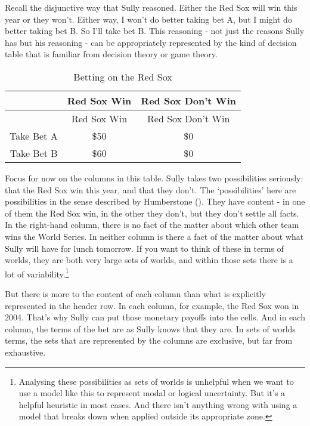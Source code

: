 \documentclass[
  12pt,
  letterpaper,
]{scrbook}
\begin{document}
Recall the disjunctive way that Sully reasoned. Either the Red Sox will
win this year or they won't. Either way, I won't do better taking bet A,
but I might do better taking bet B. So I'll take bet B. This reasoning -
not just the reasons Sully has but his reasoning - can be appropriately
represented by the kind of decision table that is familiar from decision
theory or game theory.

\begin{longtable}[]{@{}rcc@{}}
\caption{Betting on the Red Sox}\label{tbl-redsox}\tabularnewline
\toprule\noalign{}
~ & Red Sox Win & Red Sox Don't Win \\
\midrule\noalign{}
\endfirsthead
\toprule\noalign{}
~ & Red Sox Win & Red Sox Don't Win \\
\midrule\noalign{}
\endhead
\bottomrule\noalign{}
\endlastfoot
Take Bet A & \$50 & \$0 \\
Take Bet B & \$60 & \$0 \\
\end{longtable}

Focus for now on the columns in this table. Sully takes two
possibilities seriously: that the Red Sox win this year, and that they
don't. The `possibilities' here are possibilities in the sense described
by Humberstone (). They have content
- in one of them the Red Sox win, in the other they don't, but they
don't settle all facts. In the right-hand column, there is no fact of
the matter about which other team wins the World Series. In neither
column is there a fact of the matter about what Sully will have for
lunch tomorrow. If you want to think of these in terms of worlds, they
are both very large sets of worlds, and within those sets there is a lot
of variability.\footnote{Analysing these possibilities as sets of worlds
  is unhelpful when we want to use a model like this to represent modal
  or logical uncertainty. But it's a helpful heuristic in most cases.
  And there isn't anything wrong with using a model that breaks down
  when applied outside its appropriate zone.}

But there is more to the content of each column than what is explicitly
represented in the header row. In each column, for example, the Red Sox
won in 2004. That's why Sully can put those monetary payoffs into the
cells. And in each column, the terms of the bet are as Sully knows that
they are. In sets of worlds terms, the sets that are represented by the
columns are exclusive, but far from exhaustive.
\end{document}
